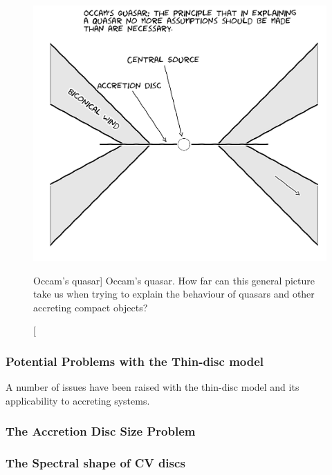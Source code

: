 \begin{figure}
\centering
\includegraphics[width=1.0\textwidth]{figures/01-intro/occam.jpg}
\caption
[Occam's quasar]
{
Occam's quasar. How far can this general picture take us when trying to explain
the behaviour of quasars and other accreting compact objects?
} 
\label{fig:occam}
\end{figure}


\subsubsection{Potential Problems with the Thin-disc model}

A number of issues have been raised with the thin-disc model and
its applicability to accreting systems. 

\subsubsection{The Accretion Disc Size Problem}

\subsubsection{The Spectral shape of CV discs}

